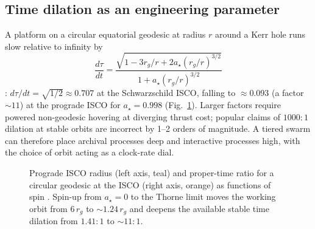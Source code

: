 \documentclass[11pt]{article}
\newcommand{\astar}{a_\star}
\begin{document}
\subsection{Time dilation as an engineering parameter}
A platform on a circular equatorial geodesic at radius $r$ around a Kerr hole runs slow relative to infinity by
\begin{equation}
\frac{d\tau}{dt} = \frac{\sqrt{1 - 3 r_g/r + 2\astar (r_g/r)^{3/2}}}{1 + \astar (r_g/r)^{3/2}}
\end{equation}
\citep{bardeen1972}: $d\tau/dt = \sqrt{1/2} \approx 0.707$ at the Schwarzschild ISCO, falling to ${\approx}0.093$ (a factor ${\sim}11$) at the prograde ISCO for $\astar = 0.998$ (Fig.~\ref{fig:isco}). Larger factors require powered non-geodesic hovering at diverging thrust cost; popular claims of $1000{:}1$ dilation at stable orbits are incorrect by 1--2 orders of magnitude. A tiered swarm can therefore place archival processes deep and interactive processes high, with the choice of orbit acting as a clock-rate dial.

\begin{figure}[t]
\centering
{}
\caption{Prograde ISCO radius (left axis, teal) and proper-time ratio for a circular geodesic at the ISCO (right axis, orange) as functions of spin \citep{bardeen1972}. Spin-up from $\astar = 0$ to the Thorne limit moves the working orbit from $6\,r_g$ to ${\sim}1.24\,r_g$ and deepens the available stable time dilation from $1.41{:}1$ to ${\sim}11{:}1$.}
\label{fig:isco}
\end{figure}
\end{document}
